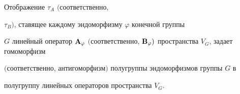 \begin{thm}\label{predst1}


Отображение $\tau_{A}$ $($соответственно,


$\tau_{B})$, ставящее каждому эндоморфизму $\varphi$ конечной группы


$G$ линейный оператор ${\bold A}_{\varphi}$ $($соответственно, ${\bold


B}_{\varphi})$ пространства $V_{G}$, задает гомоморфизм


$($соответственно, антигоморфизм$)$ полугруппы эндоморфизмов группы $G$ в


полугруппу линейных операторов пространства $V_{G}$.


\end{thm}





